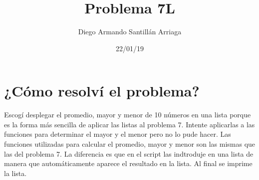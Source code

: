 \documentclass[letterpaper, 12pt, oneside]{article}%
\title{\Huge Problema 7L}
\author{Diego Armando Santillán Arriaga}
\date{22/01/19}
\begin{document}
\maketitle
\newpage
\section*{¿Cómo resolví el problema?}
Escogí desplegar el promedio, mayor y menor de 10 números en una lista porque es la forma más sencilla de aplicar las listas al problema 7. Intente aplicarlas a las funciones para determinar el mayor y el menor pero no lo pude hacer. 
Las funciones utilizadas para calcular el promedio, mayor y menor son las mismas que las del problema 7. La diferencia es que en el script las indtroduje en una lista de manera que automáticamente aparece el resultado en la lista. Al final se imprime la lista. 
\end{document}

